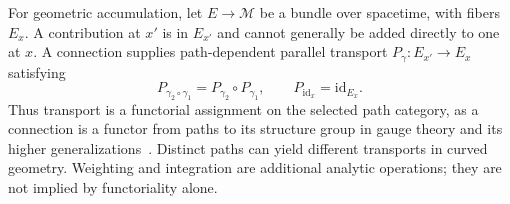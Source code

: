 \documentclass[10pt]{article}
\begin{document}
For geometric accumulation, let $E\to\mathcal M$ be a bundle over spacetime, with fibers $E_x$. A contribution at $x'$ is in $E_{x'}$ and cannot generally be added directly to one at $x$. A connection supplies path-dependent parallel transport $P_\gamma:E_{x'}\to E_x$ satisfying
\begin{equation}
P_{\gamma_2\circ\gamma_1}=P_{\gamma_2}\circ P_{\gamma_1},\qquad P_{\mathrm{id}_x}=\mathrm{id}_{E_x}.\label{e:8}
\end{equation}
Thus transport is a functorial assignment on the selected path category, as a connection is a functor from paths to its structure group in gauge theory and its higher generalizations~\cite{baezhuerta}. Distinct paths can yield different transports in curved geometry. Weighting and integration are additional analytic operations; they are not implied by functoriality alone.
\end{document}
